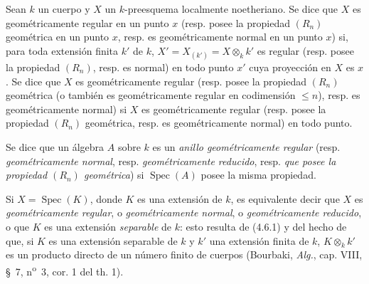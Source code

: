 \begin{definition}[6.7.6]
\label{IV.2.s6.7.6-fr}
Sean $k$ un cuerpo y $X$ un $k$-preesquema localmente noetheriano. Se dice
que $X$ es \textup{geométricamente regular en un punto $x$ (resp. posee la
propiedad $(R_n)$ geométrica en un punto $x$, resp. es geométricamente
normal en un punto $x$)} si, para toda extensión finita $k'$ de $k$,
$X'=X_{(k')}=X\otimes_k k'$ es regular \textup{(resp.} posee la propiedad
$(R_n)$\textup{, resp.} es normal) en todo punto $x'$ cuya proyección en
$X$ es $x$. Se dice que $X$ es geométricamente regular \textup{(resp.} posee
la propiedad $(R_n)$ geométrica \textup{(o también} es geométricamente regular
en codimensión $\leqslant n$)\textup{, resp.} es geométricamente normal) si $X$
es geométricamente regular \textup{(resp.} posee la propiedad $(R_n)$
geométrica\textup{, resp.} es geométricamente normal) en todo punto.
\end{definition}

Se dice que un álgebra $A$ sobre $k$ es un \emph{anillo geométricamente regular}
(resp. \emph{geométricamente normal}, resp. \emph{geométricamente reducido}, resp.
\emph{que posee la propiedad $(R_n)$ geométrica}) si $\operatorname{Spec}(A)$
posee la misma propiedad.

Si $X=\operatorname{Spec}(K)$, donde $K$ es una extensión de $k$, es
equivalente decir que $X$ es \emph{geométricamente regular}, o \emph{geométricamente
normal}, o \emph{geométricamente reducido}, o que $K$ es una extensión \emph{separable}
de $k$: esto resulta de (4.6.1) y del hecho de que, si $K$ es una extensión
separable de $k$ y $k'$ una extensión finita de $k$, $K\otimes_k k'$ es un
producto directo de un número finito de cuerpos (Bourbaki, \emph{Alg.}, cap. VIII,
§~7, n\textsuperscript{o}~3, cor. 1 del th. 1).


